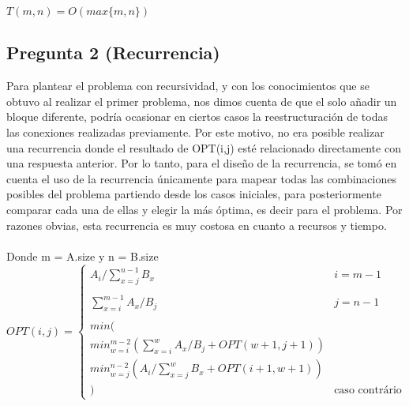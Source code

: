 \documentclass{article}
\begin{document}
	$T(m,n) = O(max\{m,n\})$
	

	\subsection*{Pregunta 2 (Recurrencia)}
	Para plantear el problema con recursividad, y con los conocimientos que se obtuvo al realizar el primer problema, nos dimos cuenta de que el solo añadir un bloque diferente, podría ocasionar en ciertos casos la reestructuración de todas las conexiones realizadas previamente. Por este motivo, no era posible realizar una recurrencia donde el resultado de OPT(i,j) esté relacionado directamente con una respuesta anterior. Por lo tanto, para el diseño de la recurrencia, se tomó en cuenta el uso de la recurrencia únicamente para mapear todas las combinaciones posibles del problema partiendo desde los casos iniciales, para posteriormente comparar cada una de ellas y elegir la más óptima, es decir para el problema. Por razones obvias, esta recurrencia es muy costosa en cuanto a recursos y tiempo.
	\\\\
	Donde m = A.size y n = B.size
	\begin{equation*}
	OPT(i,j) =
	\begin{cases}
	A_i / \sum_{x=j}^{n-1}B_x & i = m-1\\\\
	\sum_{x=i}^{m-1}A_x / B_j & j = n-1\\\\
	min(\\
	min_{w=i}^{m-2}( \sum_{x=i}^{w}A_x/ B_j + OPT(w+1, j+1))\\
	min_{w=j}^{n-2}(A_i/\sum_{x=j}^{w}B_x + OPT(i+1,w+1))\\
	) & \text{caso contrário}
	\end{cases}
	\end{equation*}
\end{document}

